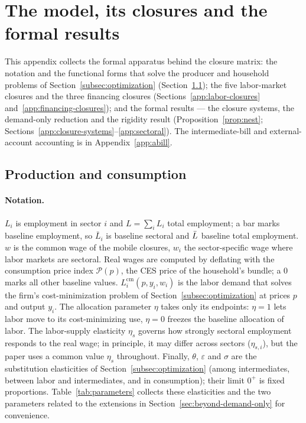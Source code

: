 \section{The model, its closures and the formal results}\label{app:proofs}

\noindent
This appendix collects the formal apparatus behind the closure matrix: the
notation and the functional forms that solve the producer and household
problems of Section~\ref{subsec:optimization}
(Section~\ref{app:model-kernel}); the five labor-market closures and the
three financing closures (Sections~\ref{app:labor-closures}
and~\ref{app:financing-closures}); and the formal results --- the closure
systems, the demand-only reduction and the rigidity result
(Proposition~\ref{prop:nest};
Sections~\ref{app:closure-systems}--\ref{app:sectoral}). The
intermediate-bill and external-account accounting is in
Appendix~\ref{app:abill}.

\subsection{Production and consumption}\label{app:model-kernel}

\paragraph{Notation.} $L_i$ is employment in sector $i$ and $L=\sum_i L_i$ total employment; a bar marks baseline employment, so $\bar L_i$ is baseline sectoral and $\bar{L}$ baseline total employment. $w$ is the common wage of the mobile closures, $w_i$ the
sector-specific wage where labor markets are sectoral. Real wages are computed by deflating with the consumption price index $\mathcal{P}(p)$, the CES price of the household's bundle; a $0$ marks all
other baseline values. $L_i^{\mathrm{cm}}(p,y_i,w_i)$ is the labor demand that
solves the firm's cost-minimization problem
of Section~\ref{subsec:optimization} at prices $p$ and output $y_i$. The
allocation parameter $\eta$ takes only its endpoints: $\eta=1$ lets labor
move to its cost-minimizing use, $\eta=0$ freezes the baseline allocation of labor.
The labor-supply elasticity $\eta_s$ governs how strongly sectoral employment
responds to the real wage; in principle, it may differ across sectors ($\eta_{s,i}$), but the paper uses a
common value $\eta_s$ throughout. Finally, $\theta$, $\varepsilon$ and $\sigma$ are the
substitution elasticities of Section~\ref{subsec:optimization} (among
intermediates, between labor and intermediates, and in consumption); their
limit $0^{+}$ is fixed proportions. Table~\ref{tab:parameters} collects these elasticities and the two parameters related to the extensions in Section~\ref{sec:beyond-demand-only} for convenience.

